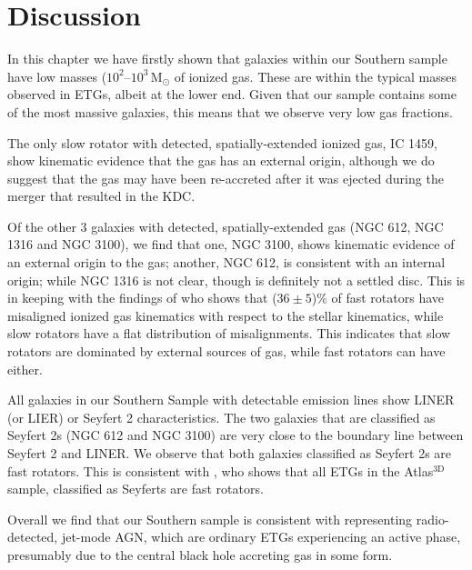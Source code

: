 \section{Discussion}
	\label{sec:discuss}
	In this chapter we have firstly shown that galaxies within our Southern sample have low masses ($10^2$--$10^3\,\mathrm{M_\odot}$ of ionized gas. These are within the typical masses observed in ETGs, albeit at the lower end. Given that our sample contains some of the most massive galaxies, this means that we observe very low gas fractions. 

	The only slow rotator with detected, spatially-extended ionized gas, IC 1459, show kinematic evidence that the gas has an external origin, although we do suggest that the gas may have been re-accreted after it was ejected during the merger that resulted in the KDC. 

	Of the other 3 galaxies with detected, spatially-extended gas (NGC 612, NGC 1316 and NGC 3100), we find that one, NGC 3100, shows kinematic evidence of an external origin to the gas; another, NGC 612, is consistent with an internal origin; while NGC 1316 is not clear, though is definitely not a settled disc. This is in keeping with the findings of \citet{Davis2011a} who shows that ($36\pm5$)\% of fast rotators have misaligned ionized gas kinematics with respect to the stellar kinematics, while slow rotators have a flat distribution of misalignments. This indicates that slow rotators are dominated by external sources of gas, while fast rotators can have either. 

	All galaxies in our Southern Sample with detectable emission lines show LINER (or LIER) or Seyfert 2 characteristics. The two galaxies that are classified as Seyfert 2s (NGC 612 and NGC 3100) are very close to the boundary line between Seyfert 2 and LINER. We observe that both galaxies classified as Seyfert 2s are fast rotators. This is consistent with \citet{Nyland2016}, who shows that all ETGs in the Atlas$^\text{3D}$ sample, classified as Seyferts are fast rotators. 

	Overall we find that our Southern sample is consistent with representing radio-detected, jet-mode AGN, which are ordinary ETGs experiencing an active phase, presumably due to the central black hole accreting gas in some form. 
